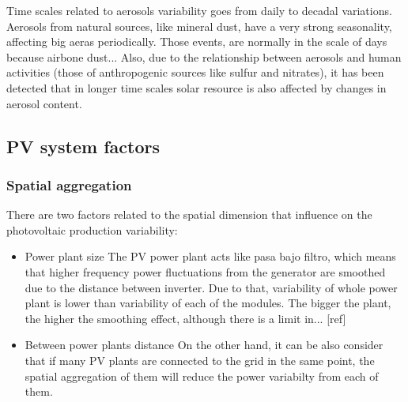 Time scales related to aerosols variability goes from daily to decadal variations. Aerosols from natural sources, like mineral dust, have a very strong seasonality, affecting big aeras periodically. Those events, are normally in the scale of days because airbone dust... Also, due to the relationship between aerosols and human activities (those of anthropogenic sources like sulfur and nitrates), it has been detected that in longer time scales solar resource is also affected by changes in aerosol content.


\subsection{PV system factors}

\subsubsection{Spatial aggregation}

There are two factors related to the spatial dimension that influence on the photovoltaic production variability:

\begin{itemize}
\item {Power plant size}
  The PV power plant acts like pasa bajo filtro, which means that higher frequency power fluctuations from the generator are smoothed due to the distance between inverter. Due to that, variability of whole power plant is lower than variability of each of the modules. The bigger the plant, the higher the smoothing effect, although there is a limit in... [ref]
\item {Between power plants distance}
  On the other hand, it can be also consider that if many PV plants are connected to the grid in the same point, the spatial aggregation of them will reduce the power variabilty from each of them.
\end{itemize}


